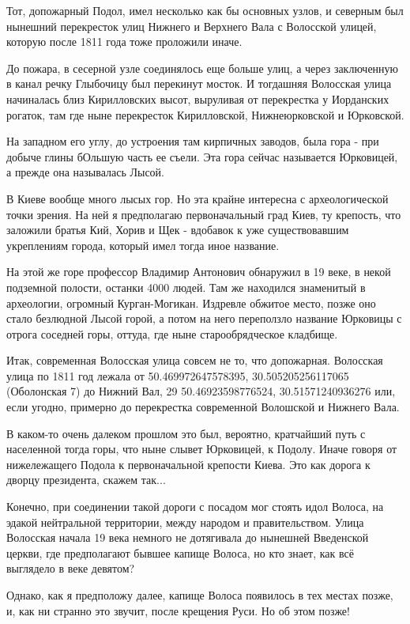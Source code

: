 \documentclass[a5paper,11pt,openany]{article}
\begin{document}
   Тот, допожарный Подол, имел несколько как бы основных узлов, и северным был нынешний перекресток улиц Нижнего и Верхнего Вала с Волосской улицей, которую после 1811 года тоже проложили иначе. 

   До пожара, в сесерной узле соединялось еще больше улиц, а через заключенную в канал речку Глыбочицу был перекинут мосток. И тогдашняя Волосская улица начиналась близ Кирилловских высот, выруливая от перекрестка у Иорданских рогаток, там где ныне перекресток Кирилловской, Нижнеюрковской и Юрковской.

   На западном его углу, до устроения там кирпичных заводов, была гора - при добыче глины бОльшую часть ее съели. Эта гора сейчас называется Юрковицей, а прежде она называлась Лысой. 

   В Киеве вообще много лысых гор. Но эта крайне интересна с археологической точки зрения. На ней я предполагаю первоначальный град Киев, ту крепость, что заложили братья Кий, Хорив и Щек - вдобавок к уже существовавшим укреплениям города, который имел тогда иное название.

   На этой же горе профессор Владимир Антонович обнаружил в 19 веке, в некой подземной полости, останки 4000 людей. Там же находился знаменитый в археологии, огромный Курган-Могикан. Издревле обжитое место, позже оно стало безлюдной Лысой горой, а потом на него переползло название Юрковицы с отрога соседней горы, оттуда, где ныне
 старообрядческое кладбище.

   Итак, современная Волосская улица совсем не то, что допожарная. Волосская улица по 1811 год лежала от 
50.469972647578395, 30.505205256117065
(Оболонская 7) до Нижний Вал, 29
50.46923598776524, 30.51571240936276
или, если угодно, примерно до перекрестка современной Волошской и Нижнего Вала.

   В каком-то очень далеком прошлом это был, вероятно, кратчайший путь с населенной тогда горы, что ныне слывет Юрковицей, к Подолу. Иначе говоря от нижележащего Подола к первоначальной крепости Киева. Это как дорога  к дворцу президента, скажем так...

  Конечно, при соединении такой дороги с посадом мог стоять идол Волоса, на эдакой нейтральной территории, между народом и правительством. Улица Волосская начала 19 века немного не дотягивала до нынешней Введенской церкви, где предполагают бывшее капище Волоса, но кто знает, как всё выглядело в веке девятом?

   Однако, как я предположу далее, капище Волоса появилось в тех местах позже, и, как ни странно это звучит, после крещения Руси. Но об этом позже!
\end{document}
